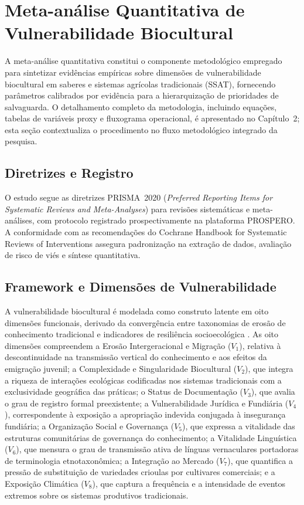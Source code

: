 \section{Meta-análise Quantitativa de Vulnerabilidade Biocultural}
\label{sec:met_meta_analise}

A meta-análise quantitativa constitui o componente metodológico empregado para sintetizar evidências empíricas sobre dimensões de vulnerabilidade biocultural em saberes e sistemas agrícolas tradicionais (SSAT), fornecendo parâmetros calibrados por evidência para a hierarquização de prioridades de salvaguarda. O detalhamento completo da metodologia, incluindo equações, tabelas de variáveis proxy e fluxograma operacional, é apresentado no Capítulo~2; esta seção contextualiza o procedimento no fluxo metodológico integrado da pesquisa.

\subsection{Diretrizes e Registro}

O estudo segue as diretrizes PRISMA~2020 (\textit{Preferred Reporting Items for Systematic Reviews and Meta-Analyses}) \cite{Page2021} para revisões sistemáticas e meta-análises, com protocolo registrado prospectivamente na plataforma PROSPERO. A conformidade com as recomendações do Cochrane Handbook for Systematic Reviews of Interventions \cite{Higgins2019} assegura padronização na extração de dados, avaliação de risco de viés e síntese quantitativa.

\subsection{Framework e Dimensões de Vulnerabilidade}

A vulnerabilidade biocultural é modelada como construto latente em oito dimensões funcionais, derivado da convergência entre taxonomias de erosão de conhecimento tradicional \cite{Agrawal2002} e indicadores de resiliência socioecológica \cite{Folke2016}. As oito dimensões compreendem a Erosão Intergeracional e Migração ($V_1$), relativa à descontinuidade na transmissão vertical do conhecimento e aos efeitos da emigração juvenil; a Complexidade e Singularidade Biocultural ($V_2$), que integra a riqueza de interações ecológicas codificadas nos sistemas tradicionais com a exclusividade geográfica das práticas; o Status de Documentação ($V_3$), que avalia o grau de registro formal preexistente; a Vulnerabilidade Jurídica e Fundiária ($V_4$), correspondente à exposição a apropriação indevida conjugada à insegurança fundiária; a Organização Social e Governança ($V_5$), que expressa a vitalidade das estruturas comunitárias de governança do conhecimento; a Vitalidade Linguística ($V_6$), que mensura o grau de transmissão ativa de línguas vernaculares portadoras de terminologia etnotaxonômica; a Integração ao Mercado ($V_7$), que quantifica a pressão de substituição de variedades crioulas por cultivares comerciais; e a Exposição Climática ($V_8$), que captura a frequência e a intensidade de eventos extremos sobre os sistemas produtivos tradicionais.

